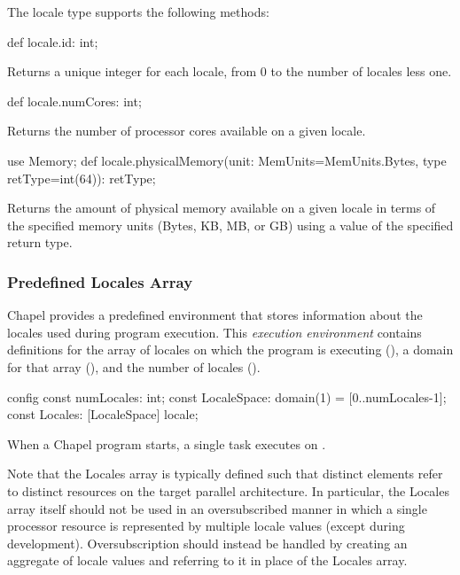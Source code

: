The locale type supports the following methods:

\begin{protohead}
def locale.id: int;
\end{protohead}
\begin{protobody}
Returns a unique integer for each locale, from 0 to the number of
locales less one.
\end{protobody}

\begin{protohead}
def locale.numCores: int;
\end{protohead}
\begin{protobody}
Returns the number of processor cores available on a given locale.
\end{protobody}

\begin{protohead}
use Memory;
def locale.physicalMemory(unit: MemUnits=MemUnits.Bytes, type retType=int(64)): retType;
\end{protohead}
\begin{protobody}
Returns the amount of physical memory available on a given locale in
terms of the specified memory units (Bytes, KB, MB, or GB) using a
value of the specified return type.
\end{protobody}

\subsubsection{Predefined Locales Array}
\label{Predefined_Locales_Array}

Chapel provides a predefined environment that stores information about
the locales used during program execution.  This {\em execution
environment} contains definitions for the array of locales on which
the program is executing (), a domain for that array
(), and the number of locales ().
\begin{chapel}
config const numLocales: int;
const LocaleSpace: domain(1) = [0..numLocales-1];
const Locales: [LocaleSpace] locale;
\end{chapel}
When a Chapel program starts, a single task executes 
on .

Note that the Locales array is typically defined such that distinct
elements refer to distinct resources on the target parallel
architecture.  In particular, the Locales array itself should not be
used in an oversubscribed manner in which a single processor resource
is represented by multiple locale values (except during development).
Oversubscription should instead be handled by creating an aggregate of
locale values and referring to it in place of the Locales array.


